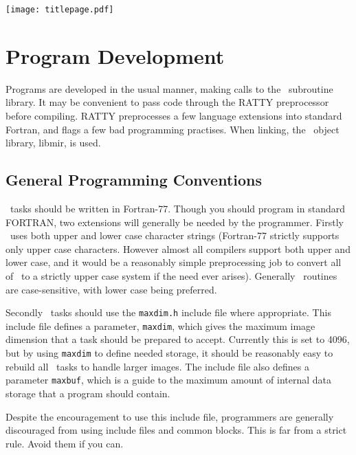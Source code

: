 \documentclass{report}
\begin{document}
\cleardoublepage
\thispagestyle{empty}
\vspace*{-1.61in}
\hspace*{-1.4in}
\texttt{[image: titlepage.pdf]}
\newpage
\tableofcontents

\newpage
{}
\listoftables

\newchapter
{}
\chapter{Program Development}
Programs are developed in the usual manner, making calls to the \miriad\
subroutine library. It may be convenient to pass code through the RATTY
preprocessor before compiling. RATTY
preprocesses a few language extensions into standard Fortran, and flags a few
bad programming practises. When linking, the \miriad\ object library, libmir,
is used.

\section{General Programming Conventions}
\miriad\ tasks should be written in Fortran-77.
Though you should program in standard FORTRAN, two
extensions will generally be needed by the programmer. Firstly \miriad\
uses both upper and lower case character strings (Fortran-77 strictly
supports only upper case characters. However almost all compilers
support both upper and lower case, and it would be a reasonably
simple preprocessing job to convert all of \miriad\ to a strictly
upper case system if the need ever arises). Generally \miriad\ routines
are case-sensitive, with lower case being preferred.

Secondly \miriad\ tasks should use the {\tt maxdim.h} include file where
appropriate. This include file
defines a parameter, {\tt maxdim}, which gives the maximum image dimension
that a task should be prepared to accept. Currently this is set to
4096, but by using {\tt maxdim} to define needed storage, it should
be reasonably easy to rebuild all \miriad\ tasks to handle larger images.
The include file also defines a parameter {\tt maxbuf}, which is a guide
to the maximum amount of internal data storage that a program should contain.

Despite the encouragement to use this include file, programmers are generally
discouraged
from using include files and common blocks. This is far from a strict rule.
Avoid them if you can.
\end{document}
